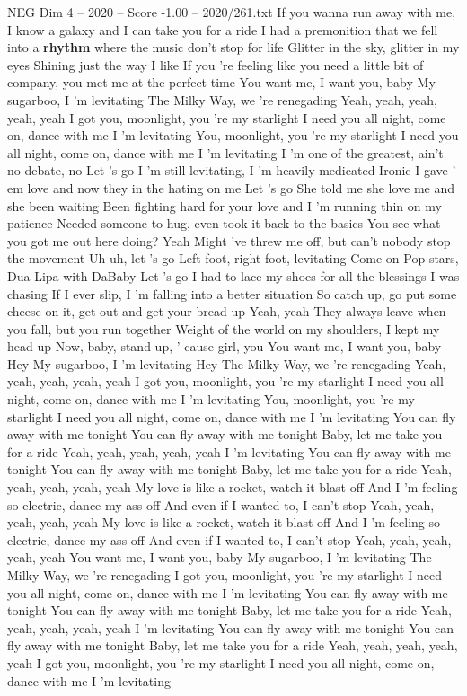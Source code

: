 \begin{textsample}{NEG Dim 4 – 2020 – Score -1.00 – 2020/261.txt}  \label{ex:f4_neg_030}
If you wanna run away with me, I know a galaxy and I can take you for a ride I had a premonition that we fell into a \textbf{rhythm} where the music don't stop for life Glitter in the sky, glitter in my eyes Shining just the way I like If you 're feeling like you need a little bit of company, you met me at the perfect time You want me, I want you, baby My sugarboo, I 'm levitating The Milky Way, we 're renegading Yeah, yeah, yeah, yeah, yeah I got you, moonlight, you 're my starlight I need you all night, come on, dance with me I 'm levitating You, moonlight, you 're my starlight I need you all night, come on, dance with me I 'm levitating I 'm one of the greatest, ain't no debate, no Let 's go I 'm still levitating, I 'm heavily medicated Ironic I gave ' em love and now they in the hating on me Let 's go She told me she love me and she been waiting Been fighting hard for your love and I 'm running thin on my patience Needed someone to hug, even took it back to the basics You see what you got me out here doing?
Yeah Might 've threw me off, but can't nobody stop the movement Uh-uh, let 's go Left foot, right foot, levitating Come on Pop stars, Dua Lipa with DaBaby Let 's go I had to lace my shoes for all the blessings I was chasing If I ever slip, I 'm falling into a better situation So catch up, go put some cheese on it, get out and get your bread up Yeah, yeah They always leave when you fall, but you run together Weight of the world on my shoulders, I kept my head up Now, baby, stand up, ' cause girl, you You want me, I want you, baby Hey My sugarboo, I 'm levitating Hey The Milky Way, we 're renegading Yeah, yeah, yeah, yeah, yeah I got you, moonlight, you 're my starlight I need you all night, come on, dance with me I 'm levitating You, moonlight, you 're my starlight I need you all night, come on, dance with me I 'm levitating You can fly away with me tonight You can fly away with me tonight Baby, let me take you for a ride Yeah, yeah, yeah, yeah, yeah I 'm levitating You can fly away with me tonight You can fly away with me tonight Baby, let me take you for a ride Yeah, yeah, yeah, yeah, yeah My love is like a rocket, watch it blast off And I 'm feeling so electric, dance my ass off And even if I wanted to, I can't stop Yeah, yeah, yeah, yeah, yeah My love is like a rocket, watch it blast off And I 'm feeling so electric, dance my ass off And even if I wanted to, I can't stop Yeah, yeah, yeah, yeah, yeah You want me, I want you, baby My sugarboo, I 'm levitating The Milky Way, we 're renegading I got you, moonlight, you 're my starlight I need you all night, come on, dance with me I 'm levitating You can fly away with me tonight You can fly away with me tonight Baby, let me take you for a ride Yeah, yeah, yeah, yeah, yeah I 'm levitating You can fly away with me tonight You can fly away with me tonight Baby, let me take you for a ride Yeah, yeah, yeah, yeah, yeah I got you, moonlight, you 're my starlight I need you all night, come on, dance with me I 'm levitating

\end{textsample}
